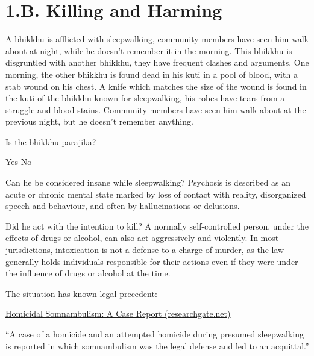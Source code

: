 \chapter{1.B. Killing and Harming}
\renewcommand*{\theChapterTitle}{1.B. Killing and Harming}

\begin{exam}{\autoExamName}

\begin{problem}

  A bhikkhu is afflicted with sleepwalking, community members have seen him walk about at night, while he doesn't remember it in the morning.
  This bhikkhu is disgruntled with another bhikkhu, they have frequent clashes and arguments.
  One morning, the other bhikkhu is found dead in his kuti in a pool of blood, with a stab wound on his chest.
  A knife which matches the size of the wound is found in the kuti of the bhikkhu known for sleepwalking, his robes have tears from a struggle and blood stains.
  Community members have seen him walk about at the previous night, but he doesn't remember anything.

  \bigskip

  Is the bhikkhu pārājika?

  \bigskip

  \begin{answers}{2}
    \bChoices
     Yes\eAns
     No\eAns
    \eChoices
  \end{answers}

  \begin{solution}
    Can he be considered insane while sleepwalking? Psychosis is described as an acute or chronic mental state marked by loss of contact with reality, disorganized speech and behaviour, and often by hallucinations or delusions.

    Did he act with the intention to kill? A normally self-controlled person, under the effects of drugs or alcohol, can also act aggressively and violently. In most jurisdictions, intoxication is not a defense to a charge of murder, as the law generally holds individuals responsible for their actions even if they were under the influence of drugs or alcohol at the time.

    The situation has known legal precedent:

    \href{https://www.researchgate.net/publication/15260363_Homicidal_Somnambulism_A_Case_Report}{Homicidal Somnambulism: A Case Report (researchgate.net)}

    ``A case of a homicide and an attempted homicide during presumed sleepwalking is reported in which somnambulism was the legal defense and led to an acquittal.''


\end{solution}
\end{problem}
\end{exam}
